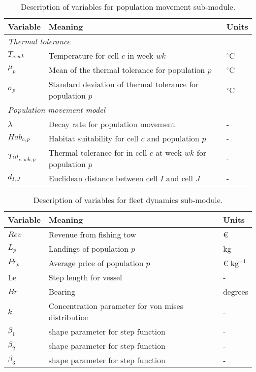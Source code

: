 \begin{table}[!ht]
	\centering
	\caption{Description of variables for population movement sub-module.}
	\label{tab:pop_move}
	\begin{tabular}{p{1.5cm} p{8cm} p{1.5cm}}
		\toprule
		Variable & Meaning & Units \\
		\hline
		\multicolumn{3}{l}{\textit{Thermal tolerance}} \\
		\hline
		$T_{c,wk}$ & Temperature for cell $c$ in week $wk$ & $^\circ$C \\
		$\mu_{p}$ & Mean of the thermal tolerance for population $p$ & $^\circ$C \\
		$\sigma_{p}$ & Standard deviation of thermal tolerance for
		population $p$ & $^\circ$C \\
		\hline
		\multicolumn{3}{l}{\textit{Population movement model}} \\
		\hline
		$\lambda$ & Decay rate for population movement & - \\
		$Hab_{c,p}$ & Habitat suitability for cell $c$ and
		population $p$ & - \\
		$Tol_{c,wk,p}$ & Thermal tolerance for in cell $c$ at week $wk$
		for population $p$ & - \\
		$d_{I,J}$ & Euclidean distance between cell $I$ and cell $J$ & - \\
		\bottomrule
		\end{tabular}
	\end{table}

\begin{table}[!ht]
	\centering
	\caption{Description of variables for fleet dynamics sub-module.}
	\label{tab:fleet_dyn}
	\begin{tabular}{p{1.5cm} p{8cm} p{1.5cm}}
		\toprule
		Variable & Meaning & Units \\
		\hline
		$Rev$ & Revenue from fishing tow & \euro \\
		$L_{p}$ & Landings of population $p$ & kg \\
		$Pr_{p}$ & Average price of population $p$ & \euro
		\hspace{0.1cm} kg$^{-1}$ \\
		Le & Step length for vessel & - \\
		$Br$ & Bearing & degrees \\
		$k$ & Concentration parameter for von mises distribution & - \\
		$\beta_{1}$ & shape parameter for step function & - \\
		$\beta_{2}$ & shape parameter for step function & - \\
		$\beta_{3}$ & shape parameter for step function & - \\
		\bottomrule
	\end{tabular}
\end{table}


